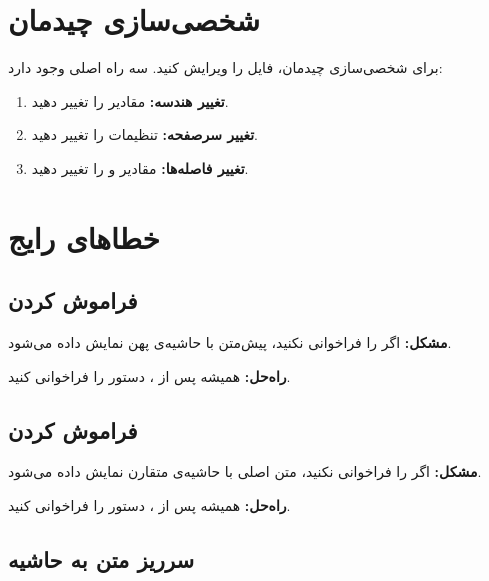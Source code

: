 \section{شخصی‌سازی چیدمان}
\label{sec:layout-customization}

برای شخصی‌سازی چیدمان، فایل
 را ویرایش کنید. سه
راه اصلی وجود دارد:

\begin{enumerate}
    \item \textbf{تغییر هندسه:} مقادیر
     را تغییر دهید.
    \item \textbf{تغییر سرصفحه:} تنظیمات
     را تغییر دهید.
    \item \textbf{تغییر فاصله‌ها:} مقادیر
     و  را
    تغییر دهید.
\end{enumerate}


\section{خطاهای رایج}
\label{sec:layout-mistakes}

\subsection{فراموش کردن }
\label{sec:layout-mistake-frontgeo}

\textbf{مشکل:} اگر 
را فراخوانی نکنید، پیش‌متن با حاشیه‌ی پهن
نمایش داده می‌شود.

\textbf{راه‌حل:} همیشه پس از ،
دستور  را فراخوانی
کنید.

\subsection{فراموش کردن }
\label{sec:layout-mistake-maingeo}

\textbf{مشکل:} اگر 
را فراخوانی نکنید، متن اصلی با حاشیه‌ی
متقارن نمایش داده می‌شود.

\textbf{راه‌حل:} همیشه پس از ،
دستور  را فراخوانی
کنید.

\subsection{سرریز متن به حاشیه}
\label{sec:layout-mistake-overflow}

